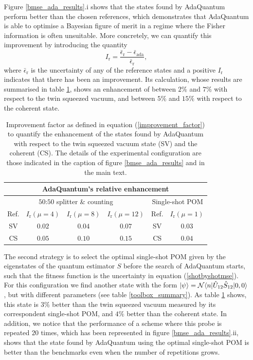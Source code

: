 Figure \ref{bmse_ada_results}.i shows that the states found by AdaQuantum perform better than the chosen references, which demonstrates that AdaQuantum is able to optimise a Bayesian figure of merit in a regime where the Fisher information is often unsuitable. More concretely, we can quantify this improvement by introducing the quantity
\begin{equation}
I_{\mathrm{r}}=\frac{\bar{\epsilon}_{\mathrm{r}}-\bar{\epsilon}_{\mathrm{ada}}}{\bar{\epsilon}_{\mathrm{r}}},
\label{improvement_factor}
\end{equation}
where $\bar{\epsilon}_{\mathrm{r}}$ is the uncertainty of any of the reference states and a positive $I_{\mathrm{r}}$ indicates that there has been an improvement. Its calculation, whose results are summarised in table \ref{bayesian_ada_improvement}, shows an enhancement of between $2\%$ and $7\%$ with respect to the twin squeezed vacuum, and between $5\%$ and $15\%$ with respect to the coherent state.

\begin{table} [t]
\centering
{\renewcommand{\arraystretch}{1.2} 
\begin{tabular}{|c|c|c|c|c|c|}
\hline
\multicolumn{6}{|c|}{AdaQuantum's relative enhancement} \\
\hline
\hline
\multicolumn{4}{|c|}{$50$:$50$ splitter \& counting } & \multicolumn{2}{c|}{Single-shot POM} \\
\hline
Ref. & $I_{\mathrm{r}}(\mu=4)$ & $I_{\mathrm{r}}(\mu=8)$ & $I_{\mathrm{r}}(\mu=12)$ & Ref. & $I_{\mathrm{r}}(\mu=1)$ \\
\hline
SV & $0.02$ & $0.04$ & $0.07$ & SV & $0.03$ \\
CS & $0.05$ & $0.10$ & $0.15$ & CS & $0.04$ \\
\hline
\end{tabular}}
\caption[AdaQuantum's relative enhancement]{Improvement factor as defined in equation (\ref{improvement_factor}) to quantify the enhancement of the states found by AdaQuantum with respect to the twin squeezed vacuum state (SV) and the coherent (CS). The details of the experimental configuration are those indicated in the caption of figure \ref{bmse_ada_results} and in the main text.}
\label{bayesian_ada_improvement}
\end{table}

The second strategy is to select the optimal single-shot POM given by the eigenstates of the quantum estimator $S$ before the search of AdaQuantum starts, such that the fitness function is the uncertainty in equation (\ref{shotbyshotmse}). For this configuration we find another state with the form  $\ket{\psi} = \mathcal{N}\langle n|\hat{U}_{12}\hat{S}_{12}|0,0\rangle$, but with different parameters (see table \ref{toolbox_summary}). As table \ref{bayesian_ada_improvement} shows, this state is $3\%$ better than the twin squeezed vacuum measured by its correspondent single-shot POM, and $4\%$ better than the coherent state. In addition, we notice that the performance of a scheme where this probe is repeated $20$ times, which has been represented in figure \ref{bmse_ada_results}.ii, shows that the state found by AdaQuantum using the optimal single-shot POM is better than the benchmarks even when the number of repetitions grows. 

